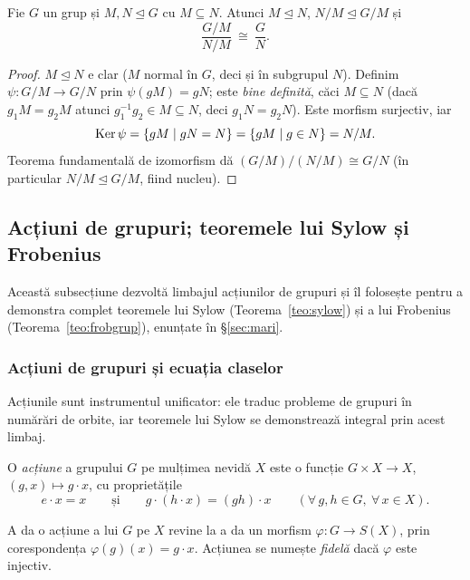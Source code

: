 \begin{teorema}\label{teo:izo3}
Fie $G$ un grup și $M,N\trianglelefteq G$ cu $M\subseteq N$. Atunci $M\trianglelefteq N$, $N/M\trianglelefteq G/M$ și
\[
\frac{G/M}{N/M}\ \cong\ \frac{G}{N}.
\]
\end{teorema}
\begin{proof}
$M\trianglelefteq N$ e clar ($M$ normal în $G$, deci și în subgrupul $N$). Definim $\psi:G/M\to G/N$ prin $\psi(gM)=gN$; este \emph{bine definită}, căci $M\subseteq N$ (dacă $g_1M=g_2M$ atunci $g_1^{-1}g_2\in M\subseteq N$, deci $g_1N=g_2N$). Este morfism surjectiv, iar
\[
\operatorname{Ker}\psi=\{gM\mid gN=N\}=\{gM\mid g\in N\}=N/M.
\]
Teorema fundamentală de izomorfism dă $(G/M)\big/(N/M)\cong G/N$ (în particular $N/M\trianglelefteq G/M$, fiind nucleu).
\end{proof}

\subsection{Acțiuni de grupuri; teoremele lui Sylow și Frobenius}\label{sec:avansat2}

Această subsecțiune dezvoltă limbajul acțiunilor de grupuri și îl folosește pentru a demonstra complet teoremele lui Sylow (Teorema~\ref{teo:sylow}) și a lui Frobenius (Teorema~\ref{teo:frobgrup}), enunțate în §\ref{sec:mari}.

\subsubsection*{Acțiuni de grupuri și ecuația claselor}

Acțiunile sunt instrumentul unificator: ele traduc probleme de grupuri în numărări de orbite, iar teoremele lui Sylow se demonstrează integral prin acest limbaj.

\begin{definitie}\label{def:actiune}
O \emph{acțiune} a grupului $G$ pe mulțimea nevidă $X$ este o funcție $G\times X\to X$, $(g,x)\mapsto g\cdot x$, cu proprietățile
\[
e\cdot x=x\qquad\text{și}\qquad g\cdot(h\cdot x)=(gh)\cdot x\qquad(\forall\,g,h\in G,\ \forall\,x\in X).
\]
\end{definitie}

\begin{propozitie}[acțiuni $=$ morfisme în $S(X)$]\label{prop:actmorf}
A da o acțiune a lui $G$ pe $X$ revine la a da un morfism $\varphi:G\to S(X)$, prin corespondența $\varphi(g)(x)=g\cdot x$. Acțiunea se numește \emph{fidelă} dacă $\varphi$ este injectiv.
\end{propozitie}

